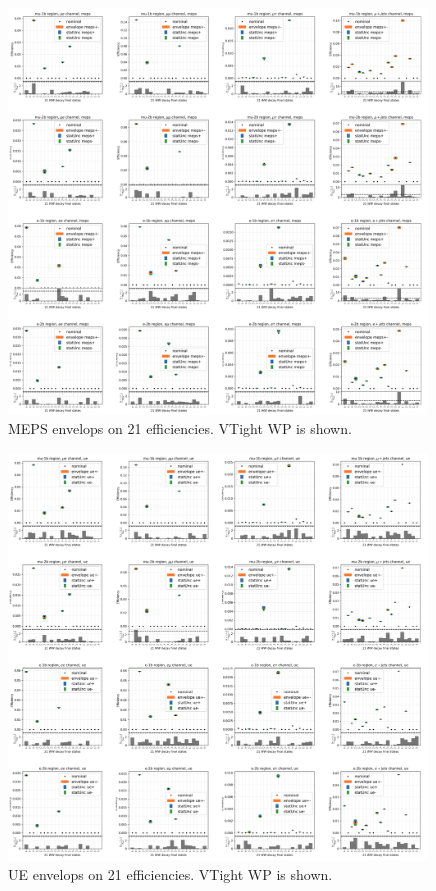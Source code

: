 \begin{figure}
    \centering
    \includegraphics[width=0.99\textwidth]{chapters/Analysis/sectionSystematics/figures/ttTheoretical/meps.png}
    \caption{MEPS envelops on 21 efficiencies. VTight WP is shown.}
    \label{fig:appendix:reweighttt:effAfterCorrMEPS}
\end{figure}


\begin{figure}
    \centering
    \includegraphics[width=0.99\textwidth]{chapters/Analysis/sectionSystematics/figures/ttTheoretical/ue.png}
    \caption{UE envelops on 21 efficiencies. VTight WP is shown.}
    \label{fig:appendix:reweighttt:effAfterCorrUE}
\end{figure}





